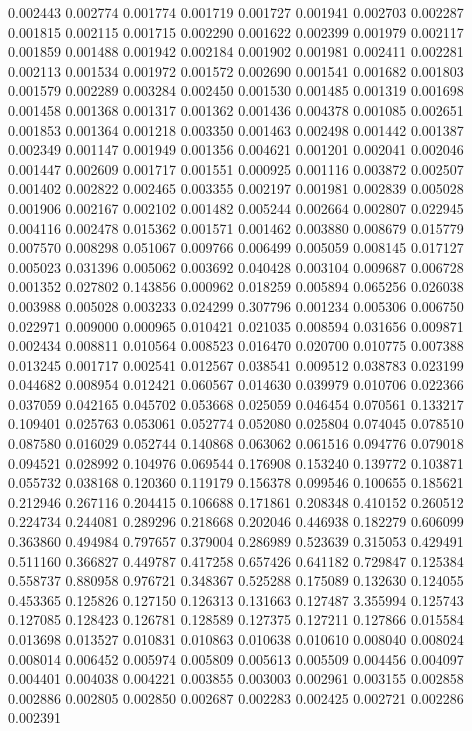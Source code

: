 0.002443
0.002774
0.001774
0.001719
0.001727
0.001941
0.002703
0.002287
0.001815
0.002115
0.001715
0.002290
0.001622
0.002399
0.001979
0.002117
0.001859
0.001488
0.001942
0.002184
0.001902
0.001981
0.002411
0.002281
0.002113
0.001534
0.001972
0.001572
0.002690
0.001541
0.001682
0.001803
0.001579
0.002289
0.003284
0.002450
0.001530
0.001485
0.001319
0.001698
0.001458
0.001368
0.001317
0.001362
0.001436
0.004378
0.001085
0.002651
0.001853
0.001364
0.001218
0.003350
0.001463
0.002498
0.001442
0.001387
0.002349
0.001147
0.001949
0.001356
0.004621
0.001201
0.002041
0.002046
0.001447
0.002609
0.001717
0.001551
0.000925
0.001116
0.003872
0.002507
0.001402
0.002822
0.002465
0.003355
0.002197
0.001981
0.002839
0.005028
0.001906
0.002167
0.002102
0.001482
0.005244
0.002664
0.002807
0.022945
0.004116
0.002478
0.015362
0.001571
0.001462
0.003880
0.008679
0.015779
0.007570
0.008298
0.051067
0.009766
0.006499
0.005059
0.008145
0.017127
0.005023
0.031396
0.005062
0.003692
0.040428
0.003104
0.009687
0.006728
0.001352
0.027802
0.143856
0.000962
0.018259
0.005894
0.065256
0.026038
0.003988
0.005028
0.003233
0.024299
0.307796
0.001234
0.005306
0.006750
0.022971
0.009000
0.000965
0.010421
0.021035
0.008594
0.031656
0.009871
0.002434
0.008811
0.010564
0.008523
0.016470
0.020700
0.010775
0.007388
0.013245
0.001717
0.002541
0.012567
0.038541
0.009512
0.038783
0.023199
0.044682
0.008954
0.012421
0.060567
0.014630
0.039979
0.010706
0.022366
0.037059
0.042165
0.045702
0.053668
0.025059
0.046454
0.070561
0.133217
0.109401
0.025763
0.053061
0.052774
0.052080
0.025804
0.074045
0.078510
0.087580
0.016029
0.052744
0.140868
0.063062
0.061516
0.094776
0.079018
0.094521
0.028992
0.104976
0.069544
0.176908
0.153240
0.139772
0.103871
0.055732
0.038168
0.120360
0.119179
0.156378
0.099546
0.100655
0.185621
0.212946
0.267116
0.204415
0.106688
0.171861
0.208348
0.410152
0.260512
0.224734
0.244081
0.289296
0.218668
0.202046
0.446938
0.182279
0.606099
0.363860
0.494984
0.797657
0.379004
0.286989
0.523639
0.315053
0.429491
0.511160
0.366827
0.449787
0.417258
0.657426
0.641182
0.729847
0.125384
0.558737
0.880958
0.976721
0.348367
0.525288
0.175089
0.132630
0.124055
0.453365
0.125826
0.127150
0.126313
0.131663
0.127487
3.355994
0.125743
0.127085
0.128423
0.126781
0.128589
0.127375
0.127211
0.127866
0.015584
0.013698
0.013527
0.010831
0.010863
0.010638
0.010610
0.008040
0.008024
0.008014
0.006452
0.005974
0.005809
0.005613
0.005509
0.004456
0.004097
0.004401
0.004038
0.004221
0.003855
0.003003
0.002961
0.003155
0.002858
0.002886
0.002805
0.002850
0.002687
0.002283
0.002425
0.002721
0.002286
0.002391

